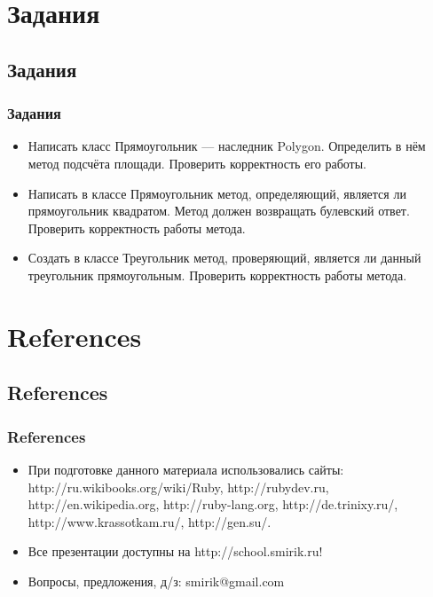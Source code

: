 \documentclass[compress,red]{beamer}
\begin{document}
\section{Задания}
\subsection{Задания}
\begin{frame}[fragile]
  \frametitle{Задания}
  \begin{itemize}
    \item Написать класс Прямоугольник --- наследник Polygon. Определить в нём метод подсчёта площади. Проверить корректность его работы.
    \item Написать в классе Прямоугольник метод, определяющий, является ли прямоугольник квадратом. Метод должен возвращать булевский ответ. Проверить корректность работы метода.
    \item Создать в классе Треугольник метод, проверяющий, является ли данный треугольник прямоугольным. Проверить корректность работы метода.
  \end{itemize}
\end{frame}

\section{References}
\subsection{References}
\begin{frame}[fragile]
  \frametitle{References}
  \begin{itemize}
    \item При подготовке данного материала использовались сайты: http://ru.wikibooks.org/wiki/Ruby, http://rubydev.ru, http://en.wikipedia.org, http://ruby-lang.org, http://de.trinixy.ru/, http://www.krassotkam.ru/, http://gen.su/.
    \item Все презентации доступны на http://school.smirik.ru!
    \item Вопросы, предложения, д/з: smirik@gmail.com
  \end{itemize}
\end{frame}
\end{document}
